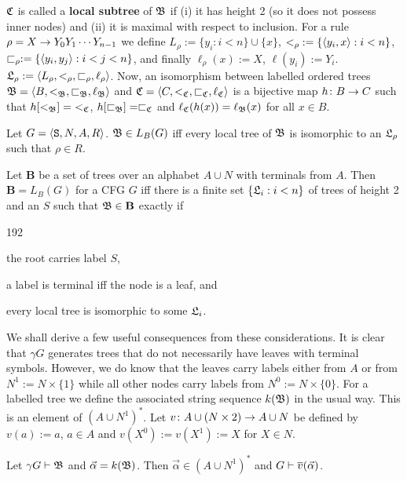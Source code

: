 $\mathfrak{C}$ is called a \textbf{local subtree} of $\mathfrak{B}$
if (i) it has height 2 (so it does not possess inner nodes)
and (ii) it is maximal with respect to inclusion.
For a rule $\rho = X \rightarrow Y_0 Y_1 \dotsb Y_{n-1}$ we define
$L_{\rho} := \{y_i : i < n\} \cup \{x\}$, $<_{\rho}\; :=
\{ \langle y_i, x\rangle : i < n\}$, $\sqsubset_{\rho} := \{\langle y_i, y_j\rangle
: i < j < n\}$, and finally $\ell_{\rho}(x) := X$, $\ell(y_i) := Y_i$.
$\mathfrak{L}_{\rho} := \langle L_{\rho}, <_{\rho}, \sqsubset_{\rho},
\ell_{\rho}\rangle$. Now, an isomorphism between labelled ordered
trees $\mathfrak{B} = \langle B, <_{\mathfrak{B}}, \sqsubset_{\mathfrak{B}}, \ell_{\mathfrak{B}}\rangle$
and $\mathfrak{C} = \langle C, <_{\mathfrak{C}}, \sqsubset_{\mathfrak{C}}, \ell_{\mathfrak{C}}\rangle$
is a bijective map $h \colon B \rightarrow C$ such that $h[<_{\mathfrak{B}}] 
= \; <_{\mathfrak{C}}$, $h[\sqsubset_{\mathfrak{B}}] = \sqsubset_{\mathfrak{C}}$
and $\ell_{\mathfrak{C}}(h(x)) = \ell_{\mathfrak{B}}(x)$ for all $x \in B$.
\begin{prop}
Let $G = \langle \mbox{\tt S}, N, A, R\rangle$. $\mathfrak{B} \in L_B(G)$ iff 
every local tree of $\mathfrak{B}$ is isomorphic to an $\mathfrak{L}_{\rho}$ such 
that $\rho \in R$.
\end{prop}
\begin{thm}
Let \textbf{B} be a set of trees over an alphabet $A \cup N$
with terminals from $A$. Then $\textbf{B} = L_B(G)$ for a
CFG $G$ iff there is a finite set $\{\mathfrak{L}_i : i < n\}$ of trees 
of height 2 and an $S$ such that $\mathfrak{B} \in \textbf{B}$ exactly if
\begin{dingautolist}{192}
\item the root carries label $S$,
\item a label is terminal iff the node is a leaf, and
\item every local tree is isomorphic to some $\mathfrak{L}_i$.
\end{dingautolist}
\end{thm}
We shall derive a few useful consequences from these considerations.
It is clear that $\gamma G$ generates trees that do not necessarily
have leaves with terminal symbols. However, we do know that the
leaves carry labels either from $A$ or from $N^1 := N \times \{1\}$
while all other nodes carry labels from $N^0 := N \times \{0\}$.
For a labelled tree we define the associated string sequence $k(\mathfrak{B})$
in the usual way. This is an element of $(A \cup N^1)^{\ast}$.
Let $v \colon A \cup (N \times 2) \rightarrow A \cup N$ be defined by
$v(a) := a$, $a \in A$ and $v(X^0) := v(X^1) := X$ for $X \in N$.
\begin{lem}
Let $\gamma G \vdash \mathfrak{B}$ and $\vec{\alpha} = k(\mathfrak{B})$.
Then $\vec{\alpha} \in (A \cup N^1)^{\ast}$
and $G \vdash \overline{v}(\vec{\alpha})$.
\end{lem}
